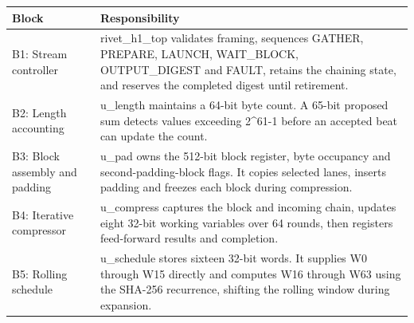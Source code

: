 \documentclass[11pt,a4paper]{article}
\begin{document}
{\small\renewcommand{\arraystretch}{1.18}\begin{longtable}{@{}L{0.24\textwidth}|L{0.7\textwidth}@{}}\toprule

\textbf{Block} & \textbf{Responsibility}\\\midrule\endhead

B1: Stream controller & rivet\_\allowbreak{}h1\_\allowbreak{}top validates framing,\allowbreak{} sequences GATHER,\allowbreak{} PREPARE,\allowbreak{} LAUNCH,\allowbreak{} WAIT\_\allowbreak{}BLOCK,\allowbreak{} OUTPUT\_\allowbreak{}DIGEST and FAULT,\allowbreak{} retains the chaining state,\allowbreak{} and reserves the completed digest until retirement.\\[2pt]\hline

B2: Length accounting & u\_\allowbreak{}length maintains a 64-bit byte count. A 65-bit proposed sum detects values exceeding 2\textasciicircum{}61-1 before an accepted beat can update the count.\\[2pt]\hline

B3: Block assembly and padding & u\_\allowbreak{}pad owns the 512-bit block register,\allowbreak{} byte occupancy and second-padding-block flags. It copies selected lanes,\allowbreak{} inserts padding and freezes each block during compression.\\[2pt]\hline

B4: Iterative compressor & u\_\allowbreak{}compress captures the block and incoming chain,\allowbreak{} updates eight 32-bit working variables over 64 rounds,\allowbreak{} then registers feed-forward results and completion.\\[2pt]\hline

B5: Rolling schedule & u\_\allowbreak{}schedule stores sixteen 32-bit words. It supplies W0 through W15 directly and computes W16 through W63 using the SHA-256 recurrence,\allowbreak{} shifting the rolling window during expansion.\\[2pt]\hline

\bottomrule\end{longtable}}
\end{document}
